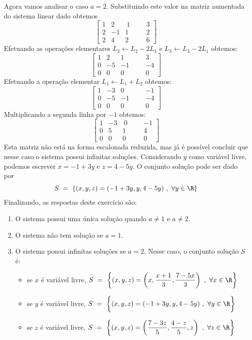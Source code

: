 \begin{solution}
\medskip
Agora vamos analisar o caso $a=2$. Substituindo este valor na matriz aumentada do sistema linear dado obtemos
$$ \left[\begin{array}{rrrr|rr}
  1 &  2 &  \ 1 & & &   3  \\
  2 & -1 &    1 & & &   2  \\ 
  2 &  4 &    2 & & &   6  \end{array}\right] $$
Efetuando as operações elementares $L_2 \leftarrow L_2 - 2L_1$ e $L_3 \leftarrow L_3 - 2L_1$ obtemos:
$$ \left[\begin{array}{rrrr|rr}
  1 &  2 &  1 & & &   3  \\
  0 & -5 & -1 & & &  -4  \\ 
  0 &  0 &  0 & & &   0  \end{array}\right] $$
Efetuando a operação elementar $L_1 \leftarrow L_1 + L_2$ obtemos:
$$ \left[\begin{array}{rrrr|rr}
  1 & -3 &  0 & & &  -1  \\
  0 & -5 & -1 & & &  -4  \\ 
  0 &  0 &  0 & & &   0  \end{array}\right] $$
Multiplicando a segunda linha por $-1$ obtemos:
$$ \left[\begin{array}{rrrr|rr}
  1 & -3 &  \ 0 & & &  -1  \\
  0 &  5 &    1 & & &   4  \\ 
  0 &  0 &    0 & & &   0  \end{array}\right] $$
 Esta matriz não está na forma escalonada reduzida, mas já é possível concluir que nesse caso o sistema possui infinitas soluções.  Considerando $y$ como variável livre, podemos escrever $x=-1+3y$ e $z=4-5y$. O conjunto solução pode ser dado por
$$S\ =\ \{ (x,y,z) = (-1+3y, y , 4-5y)\ ,\ \forall y \in \R \} $$
\medskip
Finalizando, as respostas deste exercício são:
\begin{enumerate}
\item[(a)] O sistema possui uma única solução quando $a \neq 1$ e $a \neq 2$.
\item[(b)] O sistema não tem solução se $a=1$.
\item[(c)] O sistema possui infinitas soluções se $a=2$. Nesse caso, o conjunto solução $S$ é:
\begin{itemize} 
\item se $x$ é variável livre,
$\displaystyle S\ =\ \left\{ (x,y,z) = \left(x, \dfrac{x+1}{3}, \dfrac{7-5x}{3} \right)\ ,\ \forall x \in \R \right\} $
\item se $y$ é variável livre, $S\ =\ \biggl\{ (x,y,z) = (-1+3y, y , 4-5y)\ ,\ \forall y \in \R \biggr\} $
\item se $z$ é variável livre,
$\displaystyle S\ =\ \left\{ (x,y,z) = \left( \dfrac{7-3z}{5} , \dfrac{4-z}{5} , z \right)\ ,\ \forall z \in \R \right\} $
\end{itemize}
\end{enumerate}
\end{solution}

